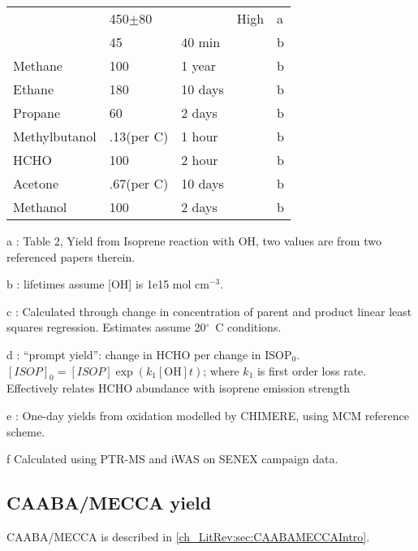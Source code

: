 \begin{table}
\begin{threeparttable}
\begin{tabular}{  l  l  l  l  l  }
      			          & 450$\pm$80      &        & High               & a      \\ 
      			          & 45              & 40 min &              & b      \\ %
	Methane 	      & 100             & 1 year  &             & b     \\ 
	Ethane            & 180             & 10 days &             & b     \\ 
	Propane           & 60              & 2 days  &             & b     \\ 
	Methylbutanol    & .13(per C)    & 1 hour  &             & b     \\ 
	HCHO             & 100             & 2 hour  &             & b     \\ 
	Acetone           & .67(per C)      & 10 days &             & b     \\ 
	Methanol          & 100             & 2 days  &             & b     \\ %
    	\bottomrule
    \end{tabular}
    \begin{tablenotes} %
      \item a \citet{AtkinsonArey2003}: Table 2, Yield from Isoprene reaction with OH, two values are from two referenced papers therein.
      \item b \citet{Palmer2003}: lifetimes assume [OH] is 1e15 mol cm$^{-3}$.
      \item c \citep{Lee2006}: Calculated through change in concentration of parent and product linear least squares regression.
        Estimates assume 20$^\circ$~C conditions.
  	  \item d \citet{Wolfe2016}: ``prompt yield'': change in HCHO per change in ISOP$_0$.
  	    $[ISOP]_0=[ISOP]\exp(k_1[\mathrm{OH}]t)$; where $k_1$ is first order loss rate.
  	    Effectively relates HCHO abundance with isoprene emission strength
      \item e \citet{Dufour2009}: One-day yields from oxidation modelled by CHIMERE, using MCM reference scheme.
      \item f Calculated using PTR-MS and iWAS on SENEX campaign data.
    \end{tablenotes}
    \label{ch_isop:tab:VOCLiteratureYields}
  \end{threeparttable} \end{table}
    
  \subsection{CAABA/MECCA yield}
  \label{Ch_isop:sec:CAABAMECCA}
    CAABA/MECCA is described in \ref{ch_LitRev:sec:CAABAMECCAIntro}.
    

